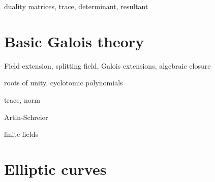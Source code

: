duality
matrices, trace, determinant, resultant

\section{Basic Galois theory}
\label{sec:basic-galois-theory}
Field extension, splitting field, Galois extensions, algebraic closure

roots of unity, cyclotomic polynomials

trace, norm

Artin-Schreier

finite fields


\section{Elliptic curves}
\label{sec:elliptic-curves}






